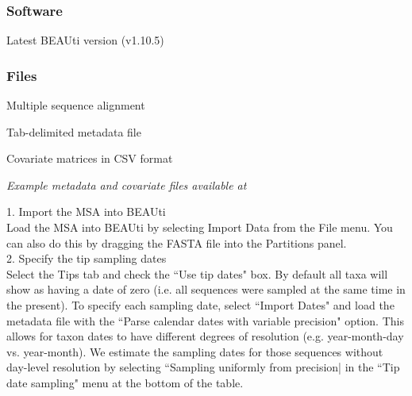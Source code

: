 \documentclass{article}
\newcommand{\ann}[1]{
\begin{adjustwidth}{0.5cm}{}
\it{#1}\\
\end{adjustwidth}}
\newcommand{\code}[1]{
{\upshape\ttfamily{#1}}}
\begin{document}
\subsubsection*{Software}
\hspace{0.5cm}Latest BEAUti version (v1.10.5)

\subsubsection*{Files}
\hspace{0.5cm}Multiple sequence alignment

\hspace{0.5cm}Tab-delimited metadata file

\hspace{0.5cm}Covariate matrices in CSV format\\

\ann{Example metadata and covariate files available at\code{github}} %

1. Import the MSA into BEAUti\\

Load the MSA into BEAUti by selecting Import Data from the File menu. You can also do this by dragging the FASTA file into the Partitions panel.\\

2. Specify the tip sampling dates\\

Select the Tips tab and check the ``Use tip dates" box. By default all taxa will show as having a date of zero (i.e. all sequences were sampled at the same time in the present).
To specify each sampling date, select ``Import Dates" and load the metadata file with the ``Parse calendar dates with variable precision" option. %
This allows for taxon dates to have different degrees of resolution (e.g. year-month-day vs. year-month). We estimate the sampling dates for those sequences without day-level resolution by selecting ``Sampling uniformly from precision| in the ``Tip date sampling" menu at the bottom of the table. \\
\end{document}
